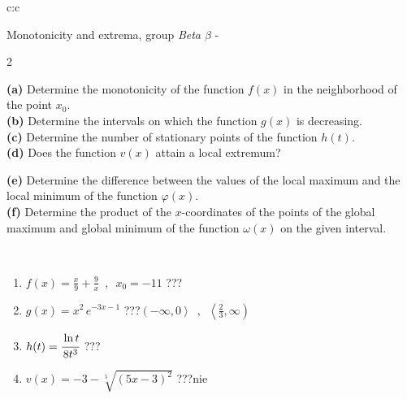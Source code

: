\documentclass[10pt]{report}
\begin{document}
\begin{tabular}{c:c}
\begin{minipage}[c][104.5mm][t]{0.5\linewidth}
\begin{center}
\vspace{5mm}
{\huge Monotonicity and extrema, group \textit{Beta $\beta$} -}\\[5mm]
\begin{minipage}{0.95\linewidth}
\begin{center}
{\small \begin{multicols}{2} \raggedright
\textbf{(a)} Determine the monotonicity of the function \(f(x)\) in the neighborhood of the point \(x_0\). \\[1mm]
\textbf{(b)} Determine the intervals on which the function \(g(x)\) is decreasing. \\[1mm]
\textbf{(c)} Determine the number of stationary points of the function \(h(t)\). \\[1mm]
\textbf{(d)} Does the function \(v(x)\) attain a local extremum? \par \columnbreak
\textbf{(e)} Determine the difference between the values of the local maximum and the local minimum of the function \(\varphi(x)\). \\[1mm]
\textbf{(f)} Determine the product of the \(x\)-coordinates of the points of the global maximum and global minimum of the function \(\omega(x)\) on the given interval. \\[1mm]
\end{multicols}
}
\end{center}
\end{minipage}
\\[1mm]
\begin{minipage}{0.79\linewidth}
\begin{center}
\begin{varwidth}{\linewidth}
\setlength{\itemsep}{0pt}
\begin{enumerate}
\normalsize
\item $f(x)=\frac{x}{9}+\frac{9}{x} \enspace , \enspace x_0=-11$\quad \dotfill\; ???\;\dotfill \quad {}
\item $g(x)=x^2\, e^{-3x-1}$\quad \dotfill\; ???\;\dotfill \quad $\left(-\infty , 0\right\rangle\enspace , \enspace \left\langle\frac{2}{3} , \infty\right)$
\item $h(t)=\cfrac{\ln t}{8t^3}$\quad \dotfill\; ???\;\dotfill {}
\item $v(x)=-3-\sqrt[5]{(5x-3)^2}$\quad \dotfill\; ???\;\dotfill \quad $\text{nie}$

\end{enumerate}
\end{varwidth}
\end{center}
\end{minipage}
\end{center}
\end{minipage}
\end{tabular}
\end{document}
